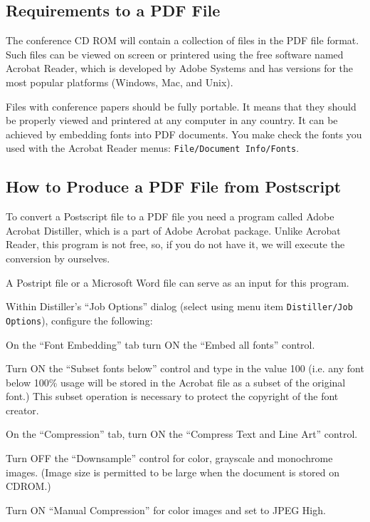 \documentclass{physcon}
\begin{document}
\subsection{Requirements to a PDF File}

The conference CD ROM will contain a collection of files
in the PDF file format. Such files can be viewed on screen
or printered using the free software named Acrobat Reader,
which is developed by Adobe Systems and has versions for the 
most popular platforms (Windows, Mac, and Unix).

Files with conference papers should be fully portable.
It means that they should be properly viewed and printered
at any computer in any country. It can be achieved by embedding
fonts into PDF documents. 
You make check the fonts you used with the 
Acrobat Reader menus:
{\tt  File/Document Info/Fonts}.    

\subsection{How to Produce a PDF File from Postscript}

To convert a Postscript file to a PDF file you need a program
called Adobe Acrobat Distiller, which is a part of Adobe Acrobat
package. Unlike Acrobat Reader, this program is not free,
so, if you do not have it, we will execute the conversion by
ourselves.

A Postript file or a Microsoft Word file can serve as an input
for this program.

Within Distiller's ``Job Options'' dialog 
(select using menu item {\tt Distiller/Job Options}), 
configure the following:

On the ``Font Embedding'' tab turn ON the ``Embed all fonts'' control.
 
Turn ON the ``Subset fonts below'' control and type in the value 100 
(i.e. any font below 100\% usage will be stored in the Acrobat file 
as a subset of the original font.) 
This subset operation is necessary to protect the copyright of 
the font creator. 

On the ``Compression'' tab, turn ON the ``Compress Text and Line Art'' 
control. 

Turn OFF the ``Downsample'' control for color, grayscale and monochrome 
images. (Image size is permitted to be large when the document 
is stored on CDROM.) 

Turn ON ``Manual Compression'' for color images and set to JPEG High.
 
\end{document}
